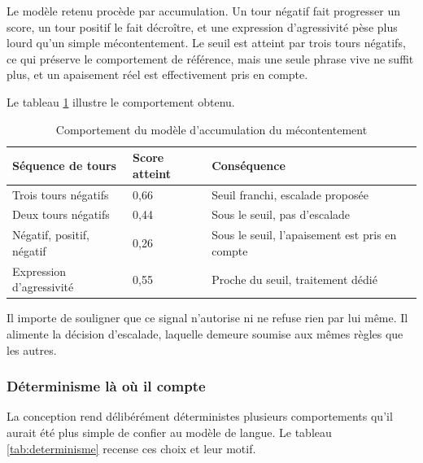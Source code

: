 Le modèle retenu procède par accumulation. Un tour négatif fait progresser un score, un tour positif le fait décroître, et une expression d'agressivité pèse plus lourd qu'un simple mécontentement. Le seuil est atteint par trois tours négatifs, ce qui préserve le comportement de référence, mais une seule phrase vive ne suffit plus, et un apaisement réel est effectivement pris en compte.

Le tableau \ref{tab:sentiment} illustre le comportement obtenu.

\begin{table}[H]
\centering
\renewcommand{\arraystretch}{1.25}
\begin{tabular}{|p{6.5cm}|p{3.2cm}|p{4.5cm}|}
\hline
\textbf{Séquence de tours} & \textbf{Score atteint} & \textbf{Conséquence} \\
\hline
Trois tours négatifs & 0,66 & Seuil franchi, escalade proposée \\
\hline
Deux tours négatifs & 0,44 & Sous le seuil, pas d'escalade \\
\hline
Négatif, positif, négatif & 0,26 & Sous le seuil, l'apaisement est pris en compte \\
\hline
Expression d'agressivité & 0,55 & Proche du seuil, traitement dédié \\
\hline
\end{tabular}
\caption{Comportement du modèle d'accumulation du mécontentement}
\label{tab:sentiment}
\end{table}

Il importe de souligner que ce signal n'autorise ni ne refuse rien par lui même. Il alimente la décision d'escalade, laquelle demeure soumise aux mêmes règles que les autres.

\subsubsection{Déterminisme là où il compte}

La conception rend délibérément déterministes plusieurs comportements qu'il aurait été plus simple de confier au modèle de langue. Le tableau \ref{tab:determinisme} recense ces choix et leur motif.

